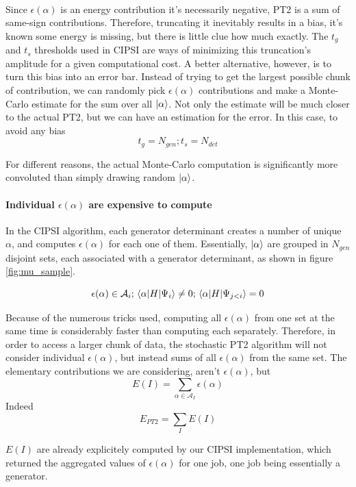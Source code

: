\documentclass[./thesis.tex]{subfiles}
\begin{document}
\paragraph{}  Since $\epsilon	(\alpha)$ is an energy contribution it's necessarily negative, PT2 is a sum of same-sign contributions. Therefore, truncating it inevitably results in a bias, it's known some energy is missing, but there is little clue how much exactly. The $t_g$ and $t_s$ thresholds used in CIPSI are ways of minimizing this truncation's amplitude for a given computational cost.
A better alternative, however, is to turn this bias into an error bar. Instead of trying to get the largest possible chunk of contribution, we can randomly pick $\epsilon(\alpha)$ contributions and make a Monte-Carlo estimate for the sum over all $\ket \alpha$. Not only the estimate will be much closer to the actual PT2, but we can have an estimation for the error. In this case, to avoid any bias
$$t_g = N_{gen} ; t_s = N_{det}$$

For different reasons, the actual Monte-Carlo computation is significantly more convoluted than simply drawing random $\ket \alpha$.

\paragraph{Individual $\epsilon(\alpha)$ are expensive to compute}
In the CIPSI algorithm, each generator determinant creates a number of unique $\alpha$, and computes $\epsilon(\alpha)$ for each one of them.
Essentially, $\ket \alpha$ are grouped in $N_{gen}$ disjoint sets, each associated with a generator determinant, as shown in figure \ref{fig:mu_sample}.

	$$\epsilon(\alpha) \in \mathcal{A}_i ; \mel{\alpha}{H}{\Psi_i} \neq 0 ; \mel{\alpha}{H}{\Psi_{j<i}} =0 $$

Because of the numerous tricks used, computing all $\epsilon(\alpha)$ from one set at the same time is considerably faster than computing each separately. Therefore, in order to access a larger chunk of data, the stochastic PT2 algorithm will not consider individual $\epsilon(\alpha)$, but instead sums of all $\epsilon(\alpha)$ from the same set.
The elementary contributions we are considering, aren't $\epsilon(\alpha)$, but
	$$E(I) = \sum_{\alpha \in \mathcal{A}_I} \epsilon(\alpha)$$
Indeed
    $$E_{PT2} = \sum_{I} E(I)$$
    
$E(I)$ are already explicitely computed by our CIPSI implementation, which returned the aggregated values of $\epsilon(\alpha)$ for one job, one job being essentially a generator.
\end{document}
